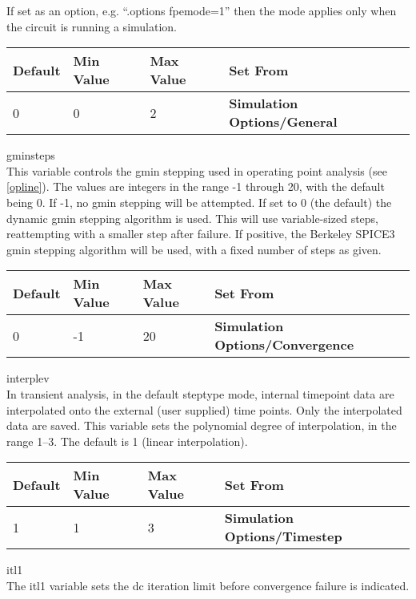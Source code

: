\begin{description}
If set as an option, e.g. ``{\vt .options fpemode=1}'' then the mode
applies only when the circuit is running a simulation.

\begin{tabular}{|l|l|l|l|}\hline
\bf Default & \bf Min Value & \bf Max Value & \bf Set From\\ \hline
0 & 0 & 2 & \bf Simulation Options/General\\ \hline
\end{tabular}

\item{\et gminsteps}\\
This variable controls the gmin stepping used in operating point
analysis (see \ref{opline}).  The values are integers in the range -1
through 20, with the default being 0.  If -1, no gmin stepping will be
attempted.  If set to 0 (the default) the dynamic gmin stepping
algorithm is used.  This will use variable-sized steps, reattempting
with a smaller step after failure.  If positive, the Berkeley SPICE3
gmin stepping algorithm will be used, with a fixed number of steps as
given.

\begin{tabular}{|l|l|l|l|}\hline
\bf Default & \bf Min Value & \bf Max Value & \bf Set From\\ \hline
0 & -1 & 20 & \bf Simulation Options/Convergence\\ \hline
\end{tabular}

\item{\et interplev}\\
In transient analysis, in the default {\et steptype} mode, internal
timepoint data are interpolated onto the external (user supplied) time
points.  Only the interpolated data are saved.  This variable sets the
polynomial degree of interpolation, in the range 1--3.  The default is
1 (linear interpolation).

\begin{tabular}{|l|l|l|l|}\hline
\bf Default & \bf Min Value & \bf Max Value & \bf Set From\\ \hline
1 & 1 & 3 & \bf Simulation Options/Timestep\\ \hline
\end{tabular}
 
\item{\et itl1}\\
The {\et itl1} variable sets the dc iteration limit before convergence
failure is indicated.


\end{description}
